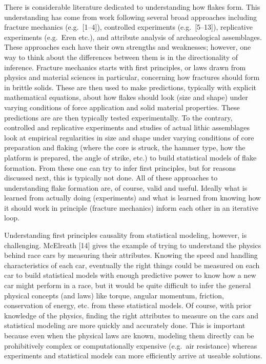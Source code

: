 \documentclass[10pt,letterpaper]{article}
\begin{document}
There is considerable literature dedicated to understanding how flakes
form. This understanding has come from work following several broad
approaches including fracture mechanics (e.g.~{[}1--4{]}), controlled
experiments (e.g.~{[}5--13{]}), replicative experiments (e.g.~Eren
etc.), and attribute analysis of archaeological assemblages. These
approaches each have their own strengths and weaknesses; however, one
way to think about the differences between them is in the directionality
of inference. Fracture mechanics starts with first principles, or laws
drawn from physics and material sciences in particular, concerning how
fractures should form in brittle solids. These are then used to make
predictions, typically with explicit mathematical equations, about how
flakes should look (size and shape) under varying conditions of force
application and solid material properties. These predictions are are
then typically tested experimentally. To the contrary, controlled and
replicative experiments and studies of actual lithic assemblages look at
empirical regularities in size and shape under varying conditions of
core preparation and flaking (where the core is struck, the hammer type,
how the platform is prepared, the angle of strike, etc.) to build
statistical models of flake formation. From these one can try to infer
first principles, but for reasons discussed next, this is typically not
done. All of these approaches to understanding flake formation are, of
course, valid and useful. Ideally what is learned from actually doing
(experiments) and what is learned from knowing how it should work in
principle (fracture mechanics) inform each other in an iterative loop.

Understanding first principles causality from statistical modeling,
however, is challenging. McElreath {[}14{]} gives the example of trying
to understand the physics behind race cars by measuring their
attributes. Knowing the speed and handling characteristics of each car,
eventually the right things could be measured on each car to build
statistical models with enough predictive power to know how a new car
might perform in a race, but it would be quite difficult to infer the
general physical concepts (and laws) like torque, angular momentum,
friction, conservation of energy, etc. from these statistical models. Of
course, with prior knowledge of the physics, finding the right
attributes to measure on the cars and statistical modeling are more
quickly and accurately done. This is important because even when the
physical laws are known, modeling them directly can be prohibitively
complex or computationally expensive (e.g.~air resistance) whereas
experiments and statistical models can more efficiently arrive at
useable solutions.
\end{document}
